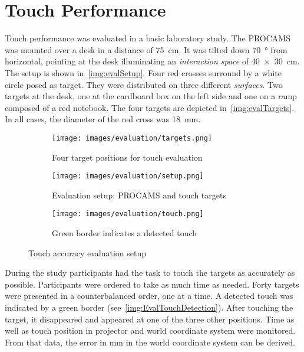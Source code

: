 \section{Touch Performance}
Touch performance was evaluated in a basic laboratory study. The PROCAMS was mounted over a desk in a distance of \SI{75}{\cm}. It was tilted down \SI{70}{\degree} from horizontal, pointing at the desk illuminating an \textit{interaction space} of \SI{40 x 30}{\cm}. The setup is shown in~\autoref{img:evalSetup}. Four red crosses surround by a white circle posed as target. They were distributed on three different \textit{surfaces}. Two targets at the desk, one at the cardboard box on the left side and one on a ramp composed of a red notebook. The four targets are depicted in~\autoref{img:evalTargets}. In all cases, the diameter of the red cross was \SI{18}{\mm}.
\begin{figure}
        \centering
        \begin{subfigure}[b]{0.31\textwidth}
                \texttt{[image: images/evaluation/targets.png]}
                \caption{Four target positions for touch evaluation}
                \label{img:evalTargets}
        \end{subfigure}
	\hfill         
        \begin{subfigure}[b]{0.31\textwidth}
                \texttt{[image: images/evaluation/setup.png]}
                \caption{Evaluation setup: PROCAMS and touch targets }
                \label{img:evalSetup}
        \end{subfigure}
	\hfill          
        \begin{subfigure}[b]{0.31\textwidth}      
                \texttt{[image: images/evaluation/touch.png]}
                \caption{Green border indicates a detected touch}
                \label{img:EvalTouchDetection}
        \end{subfigure}
        \caption{Touch accuracy evaluation setup}
        \label{fig:TouchEval}
\end{figure}

During the study participants had the task to touch the targets as accurately as possible. Participants were ordered to take as much time as needed. Forty targets were presented in a counterbalanced order, one at a time. A detected touch was indicated by a green border (see~\autoref{img:EvalTouchDetection}). After touching the target, it disappeared and appeared at one of the three other positions.
Time as well as touch position in projector and world coordinate system were monitored. From that data, the error in mm in the world coordinate system can be derived.  

